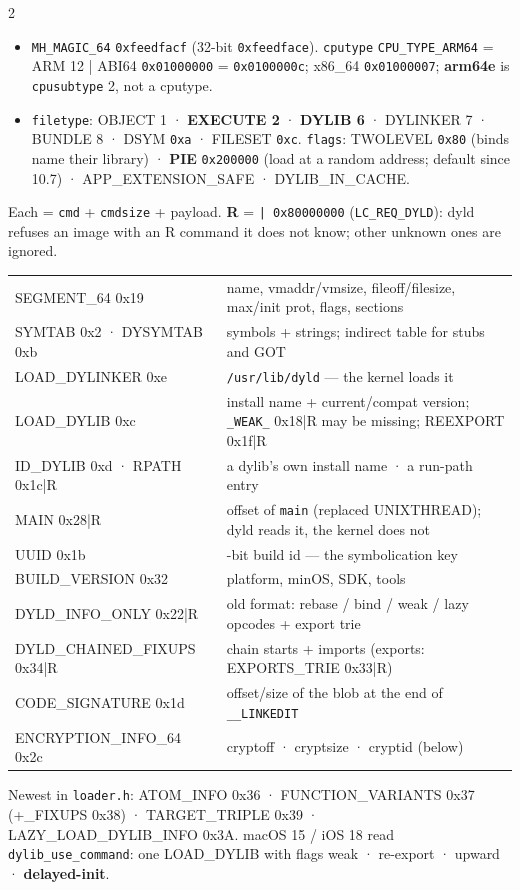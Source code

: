 \documentclass[8pt]{extarticle}
\newcommand\ct[1]{\texttt{#1}}
\newcommand\hd[1]{\par\vspace{2pt}\noindent{\bfseries\color{sheetBlue}#1}\par\vspace{1pt}}
\begin{document}
\begin{multicols}{2}
\raggedright\footnotesize{}

\hd{Header}
\begin{itemize}
  \item \ct{MH\_MAGIC\_64} \ct{0xfeedfacf} (32-bit \ct{0xfeedface}). \ct{cputype}
        \ct{CPU\_TYPE\_ARM64} = ARM 12 | ABI64 \ct{0x01000000} = \ct{0x0100000c}; x86\_64
        \ct{0x01000007}; \textbf{arm64e} is \ct{cpusubtype} 2, not a cputype.
  \item \ct{filetype}: OBJECT 1 · \textbf{EXECUTE 2} · \textbf{DYLIB 6} · DYLINKER 7 · BUNDLE 8 ·
        DSYM \ct{0xa} · FILESET \ct{0xc}. \ct{flags}: TWOLEVEL \ct{0x80} (binds name their
        library) · \textbf{PIE} \ct{0x200000} (load at a random address; default since 10.7) ·
        APP\_EXTENSION\_SAFE · DYLIB\_IN\_CACHE.
\end{itemize}

\hd{Load commands}
Each = \ct{cmd} + \ct{cmdsize} + payload. \textbf{R} = \ct{| 0x80000000} (\ct{LC\_REQ\_DYLD}):
dyld refuses an image with an R command it does not know; other unknown ones are ignored.\par
{\scriptsize\setlength{\tabcolsep}{2pt}
\begin{tabular}{@{}>{\ttfamily\raggedright\arraybackslash}p{27mm}>{\raggedright\arraybackslash}p{50mm}@{}}
\toprule
SEGMENT\_64 0x19 & name, vmaddr/vmsize, fileoff/filesize, max/init prot, flags, sections\\
SYMTAB 0x2 · DYSYMTAB 0xb & symbols + strings; indirect table for stubs and GOT\\
LOAD\_DYLINKER 0xe & \ct{/usr/lib/dyld} — the kernel loads it\\
LOAD\_DYLIB 0xc & install name + current/compat version; \ct{\_WEAK\_} 0x18|R may be missing; REEXPORT 0x1f|R\\
ID\_DYLIB 0xd · RPATH 0x1c|R & a dylib's own install name · a run-path entry\\
MAIN 0x28|R & offset of \ct{main} (replaced UNIXTHREAD); dyld reads it, the kernel does not\\
UUID 0x1b & 128-bit build id — the symbolication key\\
BUILD\_VERSION 0x32 & platform, minOS, SDK, tools\\
DYLD\_INFO\_ONLY 0x22|R & old format: rebase / bind / weak / lazy opcodes + export trie\\
DYLD\_CHAINED\_FIXUPS 0x34|R & chain starts + imports (exports: EXPORTS\_TRIE 0x33|R)\\
CODE\_SIGNATURE 0x1d & offset/size of the blob at the end of \ct{\_\_LINKEDIT}\\
ENCRYPTION\_INFO\_64 0x2c & cryptoff · cryptsize · cryptid (below)\\
\bottomrule
\end{tabular}}\par
Newest in \ct{loader.h}: ATOM\_INFO 0x36 · FUNCTION\_VARIANTS 0x37 (+\_FIXUPS 0x38) ·
TARGET\_TRIPLE 0x39 · LAZY\_LOAD\_DYLIB\_INFO 0x3A. macOS 15 / iOS 18 read
\ct{dylib\_use\_command}: one LOAD\_DYLIB with flags weak · re-export · upward · \textbf{delayed-init}.


\end{multicols}
\end{document}
